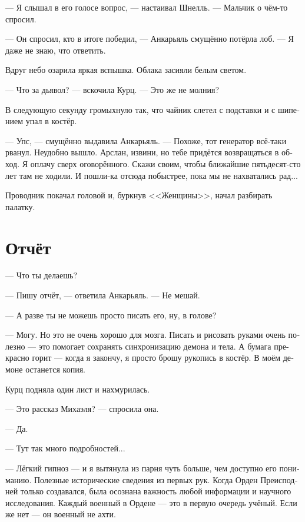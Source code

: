 \documentclass[a4paper,10pt,fleqn]{book}\usepackage{polyglossia}\setdefaultlanguage[babelshorthands=true]{russian}\setotherlanguage{english}\defaultfontfeatures{Ligatures=TeX,Mapping=tex-text}\usepackage{xcolor}\newcommand{\ml}[3]{#2}
\begin{document}
--- Я слышал в его голосе вопрос, --- настаивал Шнелль.
--- Мальчик о чём-то спросил.

--- Он спросил, кто в итоге победил, --- Анкарьяль смущённо потёрла лоб.
--- Я даже не знаю, что ответить.

Вдруг небо озарила яркая вспышка.
Облака засияли белым светом.

--- Что за дьявол? --- вскочила Курц.
--- Это же не молния?

В следующую секунду громыхнуло так, что чайник слетел с подставки и с шипением упал в костёр.

--- Упс, --- смущённо выдавила Анкарьяль.
--- Похоже, тот генератор всё-таки рванул.
Неудобно вышло.
Арслан, извини, но тебе придётся возвращаться в обход.
Я оплачу сверх оговорённого.
Скажи своим, чтобы ближайшие пятьдесят-сто лет там не ходили.
И пошли-ка отсюда побыстрее, пока мы не нахватались рад...

Проводник покачал головой и, буркнув <<Женщины>>, начал разбирать палатку.

\section{Отчёт}

--- Что ты делаешь?

--- Пишу отчёт, --- ответила Анкарьяль.
--- Не мешай.

--- А разве ты не можешь просто писать его, ну, в голове?

--- Могу.
Но это не очень хорошо для мозга.
Писать и рисовать руками очень полезно --- это помогает сохранять синхронизацию демона и тела.
А бумага прекрасно горит --- когда я закончу, я просто брошу рукопись в костёр.
В моём демоне останется копия.

Курц подняла один лист и нахмурилась.

--- Это рассказ Михаэля? --- спросила она.

--- Да.

--- Тут так много подробностей...

--- Лёгкий гипноз --- и я вытянула из парня чуть больше, чем доступно его пониманию.
Полезные исторические сведения из первых рук.
Когда Орден Преисподней только создавался, была осознана важность любой информации и научного исследования.
\ml{$0$}
{Каждый военный в Ордене --- это в первую очередь учёный.}
{Every military in the Order is a scientist in the first place.}
\ml{$0$}
{Если же нет --- он военный не ахти.}
{Otherwise, they're not much of a military.''}
\end{document}

